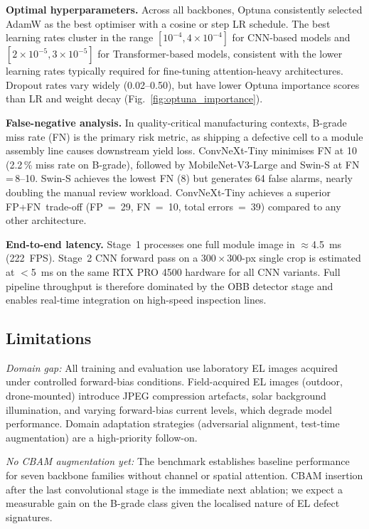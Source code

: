 \documentclass[conference]{IEEEtran}
\begin{document}
\textbf{Optimal hyperparameters.} Across all backbones, Optuna consistently selected AdamW as the best optimiser with a cosine or step LR schedule. The best learning rates cluster in the range $[10^{-4}, 4×10^{-4}]$ for CNN-based models and $[2×10^{-5}, 3×10^{-5}]$ for Transformer-based models, consistent with the lower learning rates typically required for fine-tuning attention-heavy architectures. Dropout rates vary widely (0.02--0.50), but have lower Optuna importance scores than LR and weight decay (Fig.~\ref{fig:optuna_importance}).

\textbf{False-negative analysis.} In quality-critical manufacturing contexts, B-grade miss rate (FN) is the primary risk metric, as shipping a defective cell to a module assembly line causes downstream yield loss. ConvNeXt-Tiny minimises FN at 10 (2.2\,\% miss rate on B-grade), followed by MobileNet-V3-Large and Swin-S at FN\,=\,8--10. Swin-S achieves the lowest FN (8) but generates 64 false alarms, nearly doubling the manual review workload. ConvNeXt-Tiny achieves a superior FP+FN trade-off (FP = 29, FN = 10, total errors = 39) compared to any other architecture.

\textbf{End-to-end latency.} Stage~1 processes one full module image in $\approx$4.5~ms (222~FPS). Stage~2 CNN forward pass on a $300\times300$-px single crop is estimated at $<$5~ms on the same RTX PRO 4500 hardware for all CNN variants. Full pipeline throughput is therefore dominated by the OBB detector stage and enables real-time integration on high-speed inspection lines.

\subsection{Limitations}

\textit{Domain gap:} All training and evaluation use laboratory EL images acquired under controlled forward-bias conditions. Field-acquired EL images (outdoor, drone-mounted) introduce JPEG compression artefacts, solar background illumination, and varying forward-bias current levels, which degrade model performance. Domain adaptation strategies (adversarial alignment, test-time augmentation) are a high-priority follow-on.

\textit{No CBAM augmentation yet:} The benchmark establishes baseline performance for seven backbone families without channel or spatial attention. CBAM insertion after the last convolutional stage is the immediate next ablation; we expect a measurable gain on the B-grade class given the localised nature of EL defect signatures.
\end{document}
